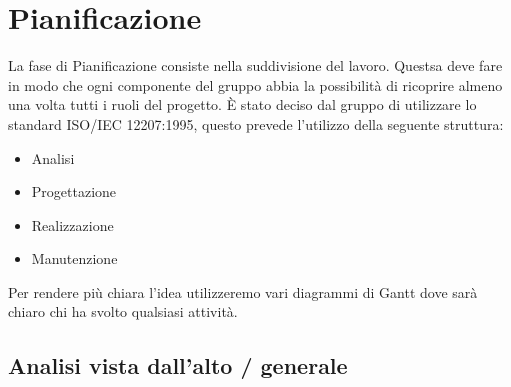 \newpage
\section{Pianificazione} \label{Pianificazione}
	La fase di Pianificazione consiste nella suddivisione del lavoro. Questsa deve fare in modo che ogni componente del gruppo abbia la possibilità di ricoprire almeno una volta tutti i ruoli del progetto. È stato deciso dal gruppo di utilizzare lo standard ISO/IEC 12207:1995, questo prevede l'utilizzo della seguente struttura:
	\begin{itemize}
			\item Analisi
			\item Progettazione
			\item Realizzazione
			\item Manutenzione
		\end{itemize}
	Per rendere più chiara l'idea utilizzeremo vari diagrammi di Gantt dove sarà chiaro chi ha svolto qualsiasi attività.	
		\subsection{Analisi vista dall'alto / generale}
		
